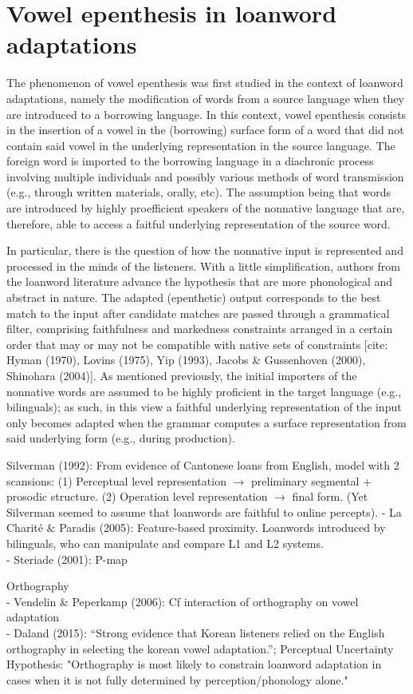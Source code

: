 \section{Vowel epenthesis in loanword adaptations}
The phenomenon of vowel epenthesis was first studied in the context of loanword adaptations, namely the modification of words from a source language when they are introduced to a borrowing language. In this context, vowel epenthesis consists in the insertion of a vowel in the (borrowing) surface form of a word that did not contain said vowel in the underlying representation in the source language.  
The foreign word is imported to the borrowing language in a diachronic process involving multiple individuals and possibly various methods of word transmission (e.g., through written materials, orally, etc). The assumption being that words are introduced by highly proefficient speakers of the nonnative language that are, therefore, able to access a faitful underlying representation of the source word. 

In particular, there is the question of how the nonnative input is represented and processed in the minds of the listeners. With a little simplification, authors from the loanword literature advance the hypothesis that are more phonological and abstract in nature. The adapted (epenthetic) output corresponds to the best match to the input after candidate matches are passed through a grammatical filter, comprising faithfulness and markedness constraints arranged in a certain order that may or may not be compatible with native sets of constraints [cite: Hyman (1970), Lovins (1975), Yip (1993), Jacobs \& Gussenhoven (2000), Shinohara (2004)]. As mentioned previously, the initial importers of the nonnative words are assumed to be highly proficient in the target language (e.g., bilinguals); as such, in this view a faithful underlying representation of the input only becomes adapted when the grammar computes a surface representation from said underlying form (e.g., during production).   

        \item Silverman (1992): From evidence of Cantonese loans from English, model with 2 scansions: (1) Perceptual level representation $\rightarrow$ preliminary segmental + prosodic structure. (2) Operation level representation $\rightarrow$ final form. (Yet Silverman seemed to assume that loanwords are faithful to online percepts).
    - La Charité \& Paradis (2005): Feature-based proximity. Loanwords introduced by bilinguals, who can manipulate and compare L1 and L2 systems. \\
    - Steriade (2001): P-map
      \item Orthography \\
    - Vendelin \& Peperkamp (2006): Cf interaction of orthography on vowel adaptation \\ 
    - Daland (2015): ``Strong evidence that Korean listeners relied on the English orthography in selecting the korean vowel adaptation.''; Perceptual Uncertainty Hypothesis: "Orthography is most likely to constrain loanword adaptation in cases when it is not fully determined by perception/phonology alone."

